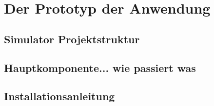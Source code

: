 \chapter{\label{chap:implementierung}Der Prototyp der Anwendung}
\section{Simulator Projektstruktur}
\section{Hauptkomponente... wie passiert was}
%
%
\section{Installationsanleitung}

